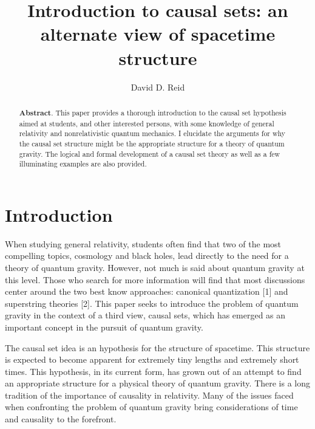 




\author{David D. Reid}
\address{Department of Physics and Astronomy\\
Eastern Michigan University, Ypsilanti, MI 48197}
\title{Introduction to causal sets: an alternate view of spacetime structure }
\maketitle

\begin{abstract}
{\bf Abstract}. This paper provides a thorough introduction to the causal
set hypothesis aimed at students, and other interested persons, with some
knowledge of general relativity and nonrelativistic quantum mechanics. I
elucidate the arguments for why the causal set structure might be the
appropriate structure for a theory of quantum gravity. The logical and
formal development of a causal set theory as well as a few illuminating
examples are also provided.
\end{abstract}

\section{Introduction}

When studying general relativity, students often find that two of the most
compelling topics, cosmology and black holes, lead directly to the need for
a theory of quantum gravity. However, not much is said about quantum gravity
at this level. Those who search for more information will find that most
discussions center around the two best know approaches: canonical
quantization [1] and superstring theories [2]. This paper seeks to introduce
the problem of quantum gravity in the context of a third view, causal sets,
which has emerged as an important concept in the pursuit of quantum gravity.

The causal set idea is an hypothesis for the structure of spacetime. This
structure is expected to become apparent for extremely tiny lengths and
extremely short times. This hypothesis, in its current form, has grown out
of an attempt to find an appropriate structure for a physical theory of
quantum gravity. There is a long tradition of the importance of causality in
relativity. Many of the issues faced when confronting the problem of quantum
gravity bring considerations of time and causality to the forefront.

